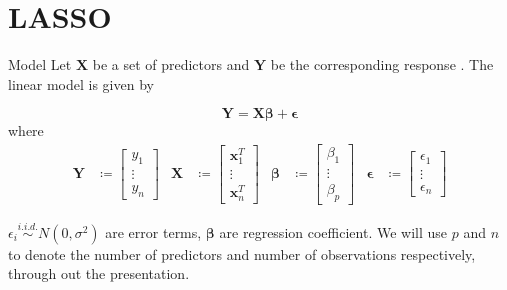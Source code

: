 \documentclass[tikz]{beamer}					%
\newcommand{\bbeta}{\bm{\beta}}
\begin{document}
\section{LASSO}

{

\begin{frame}{Model}
Let $\bm{X}$ be a set of predictors and $\bm{Y}$ be the corresponding response .
The linear model is given by

\begin{equation}
\label{linear_model}
\bm{Y}=\bm{X}\bbeta+\bm{\epsilon}
\end{equation}
where 
\begin{align}
\bm{Y} &\coloneqq\begin{bmatrix} y_1 \\ \vdots \\ y_n \end{bmatrix} &
\bm{X} &\coloneqq\begin{bmatrix} \bm{x}_1^T \\ \vdots \\ \bm{x}_n^T\end{bmatrix} &
\bbeta &\coloneqq\begin{bmatrix}\beta_1 \\ \vdots \\ \beta_p\end{bmatrix} &
\bm{\epsilon} &\coloneqq \begin{bmatrix}\epsilon_1 \\ \vdots \\ \epsilon_n\end{bmatrix}
\end{align}

$\epsilon_i\stackrel{i.i.d.}{\sim} N(0,\sigma^2)$ are error terms, 
$\bm{\beta}$ are regression coefficient. 
We will use $p$ and $n$ to denote the number of predictors 
and number of observations respectively, through out the presentation.
\end{frame}
}
\end{document}
